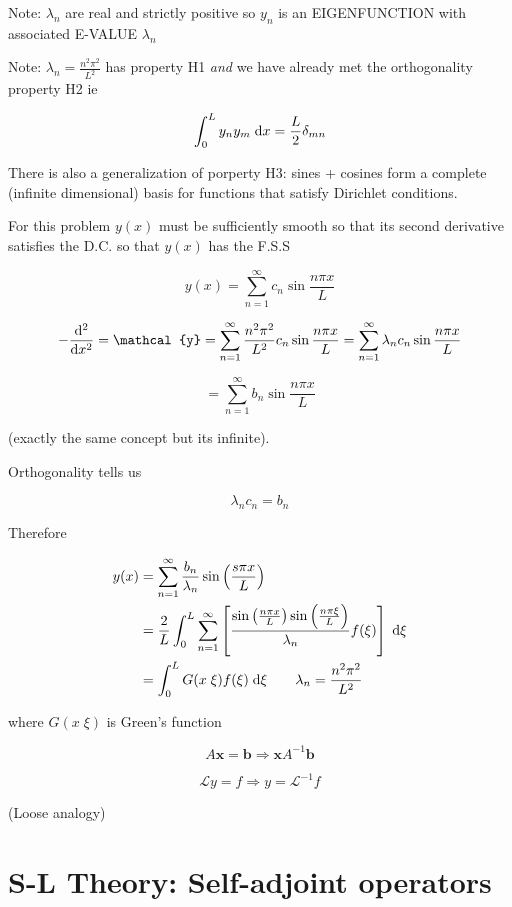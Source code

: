 \documentclass[a4paper]{article}
\begin{document}
Note: $ \lambda_{n} $ are real and strictly positive so $ y_{n} $ is an EIGENFUNCTION with associated E-VALUE $ \lambda_{n} $
 
Note: $  \lambda_{n} = \frac{n^{2} \pi^{2}}{L^{2}}  $ has property H1 \emph{and} we have already met the orthogonality property H2 ie

\[ \int_{0}^{L} y_{n} y_{m} \; \mathrm{d} x = \frac{L}{2} \delta_{mn} \]

There is also a generalization of porperty H3: sines + cosines form a complete (infinite dimensional) basis for functions that satisfy Dirichlet conditions.

For this problem $ y(x) $ must be sufficiently smooth so that its second derivative satisfies the D.C. so that $ y(x) $ has the F.S.S

\[ y(x)  = \sum_{n=1}^{\infty} c_{n} \sin \frac{n \pi x}{L}  \]

\[ - \frac{\d^{2} }{\d x^{2}}  = \mathcal{y} = \sum_{n = 1 }^{\infty} \frac{n^{2} \pi^{2}}{L^{2}} c_{n} \sin \frac{n \pi x}{L} = \sum_{n = 1 }^{\infty} \lambda_{n} c_{n} \sin \frac{n \pi x}{L} \]

\[ = \sum_{n=1}^{\infty} b_{n} \sin \frac{n \pi x}{L} \]

(exactly the same concept but its infinite).

Orthogonality tells us 

\[ \lambda_{n} c_{n} = b_{n} \]

Therefore

\begin{align*}
y(x) & = \sum_{n=1}^{\infty} \frac{b_{n}}{\lambda_{n}} \sin \left( \frac{s \pi x}{L} \right)  \\
& = \frac{2}{L} \int_{0}^{L} \sum_{n=1}^{\infty} \left[  \frac{\sin \left( \frac{n \pi x}{L}\right) \sin \left( \frac{n \pi \xi}{L} \right)}{\lambda_{n}} f(\xi) \right]  \; \mathrm{d} \xi \\
& = \int_{0}^{L} G(x \; \xi) f(\xi) \; \mathrm{d} \xi \qquad \lambda_{n} = \frac{n^{2} \pi^{2}}{L^{2}}
\end{align*}

where $  G(x \; \xi)  $ is Green's function

\[ A \mathbf{x} = \mathbf{b} \Rightarrow \mathbf{x} A^{-1} \mathbf{b} \]

\[ \mathcal{L} y = f \Rightarrow y = \mathcal{L}^{-1} f \]

(Loose analogy)

\section{S-L Theory: Self-adjoint operators}
\end{document}
